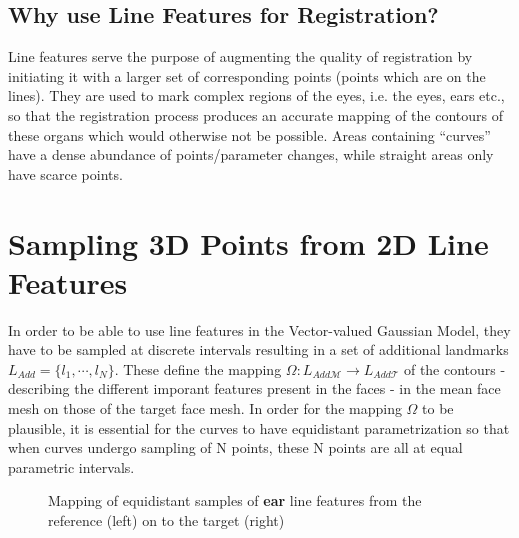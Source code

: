 \subsection{Why use Line Features for Registration?} 
Line features serve the purpose of augmenting the quality of registration by initiating it with a larger set of corresponding points (points which are on the lines). They are used to mark complex regions of the eyes, i.e. the eyes, ears etc., so that the registration process produces an accurate mapping of the contours of these organs which would otherwise not be possible.  Areas containing ``curves'' have a dense abundance of points/parameter changes, while straight areas only have scarce points.  

\section{Sampling 3D Points from 2D Line Features} 
In order to be able to use line features in the Vector-valued Gaussian Model, they have to be sampled at discrete intervals resulting in a set of additional landmarks $L_{Add} = \{l_{1}, \cdots, l_{N}\}$. These define the mapping $\Omega:L_{Add\mathcal{M}} \rightarrow L_{Add\mathcal{T}}$ of the contours - describing the different imporant features present in the faces - in the mean face mesh on those of the target face mesh. In order for the mapping $\Omega$ to be plausible, it is essential
for the curves to have equidistant parametrization so that when curves undergo sampling of N points, these N points are all at equal parametric intervals.

\def\earpathf{(-1,1.5) .. controls (-1,2.3) and (1,2.8) .. (1,1.5) .. controls (1, -.2) and (0.3,-.1) .. (0.3,-1) .. controls (0.2,-1.5) and (-.5, -1.7) .. (-1,-1.25);}
\def\earpathl{(3,2) .. controls (3,3.3) and (5.6,3.7) .. (5.6,2) .. controls (5.6, 0) and (4.6,0) .. (4.6,-1.3) .. controls (4.6,-2) and (3.5, -2) .. (3,-1.5);}
\begin{figure}[h!]
\centering
{}
\label{fig:DiffEars}
\caption{Mapping of equidistant samples of \textbf{ear} line features from the reference (left) on to the target (right)}
\end{figure}

